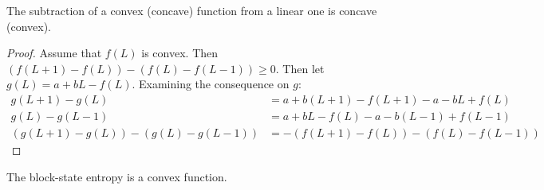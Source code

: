 \begin{Lem}
The subtraction of a convex (concave) function from a linear one is concave (convex).
\end{Lem}

\begin{proof}
Assume that $f(L)$ is convex. Then $(f(L+1) - f(L)) - (f(L) - f(L-1)) \ge 0$. Then let $g(L) = a + b L - f(L)$. Examining the consequence on $g$:
\begin{align*}
g(L+1) - g(L) &= a + b(L+1) - f(L+1) - a - bL + f(L)\\
g(L) - g(L-1) &= a + bL - f(L) - a - b(L-1) + f(L-1)\\
(g(L+1) - g(L)) - (g(L) - g(L-1)) &= -(f(L+1) - f(L)) - (f(L) - f(L-1))
\end{align*}
\end{proof}

\begin{Prop}
The block-state entropy is a convex function.
\end{Prop}

